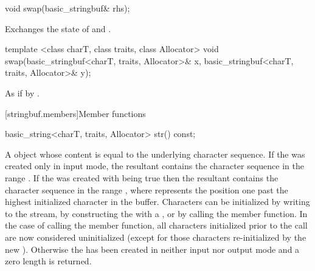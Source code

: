 %
%
\begin{itemdecl}
void swap(basic_stringbuf& rhs);
\end{itemdecl}

\begin{itemdescr}
\pnum
\effects Exchanges the state of 
and .
\end{itemdescr}

%
%
\begin{itemdecl}
template <class charT, class traits, class Allocator>
  void swap(basic_stringbuf<charT, traits, Allocator>& x,
            basic_stringbuf<charT, traits, Allocator>& y);
\end{itemdecl}

\begin{itemdescr}
\pnum
\effects As if by .
\end{itemdescr}

[stringbuf.members]{Member functions}

%
\begin{itemdecl}
basic_string<charT, traits, Allocator> str() const;
\end{itemdecl}

\begin{itemdescr}
\pnum
\returns
A
object whose content is equal to the
underlying character sequence.
If the  was created only in input mode, the resultant
 contains the character sequence in the range
. If the  was created with
 being true then the resultant 
contains the character sequence in the range , where
 represents the position one past the highest initialized character
in the buffer. Characters can be initialized by writing to the stream, by constructing
the  with a , or by calling the
 member function. In the case of calling the
 member function, all characters initialized prior to
the call are now considered uninitialized (except for those characters re-initialized
by the new ). Otherwise the  has been created
in neither input nor output mode and a zero length  is returned. 
\end{itemdescr}

